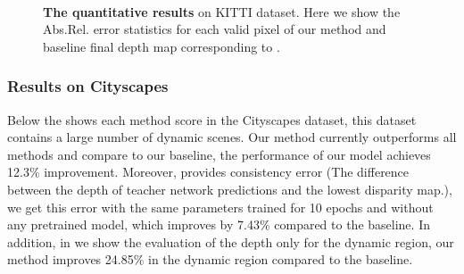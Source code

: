\documentclass[journal]{IEEEtran}
\begin{document}
\begin{figure*}
	\centering
	\\

    \caption{\textbf{The quantitative results} on KITTI dataset. Here we show the Abs.Rel. error statistics for each valid pixel of our method and baseline final depth map corresponding to .}
    \label{fig:6}
\end{figure*}

\subsubsection{Results on Cityscapes}
Below the  shows each method score in the Cityscapes dataset, this dataset contains a large number of dynamic scenes. Our method currently outperforms all methods and compare to our baseline, the performance of our model achieves 12.3\% improvement. Moreover,  provides consistency error (The difference between the depth of teacher network predictions and the lowest disparity map.), we get this error with the same parameters trained for 10 epochs and without any pretrained model, which improves by 7.43\% compared to the baseline. In addition, in  we show the evaluation of the depth only for the dynamic region, our method improves 24.85\% in the dynamic region compared to the baseline.
\end{document}
